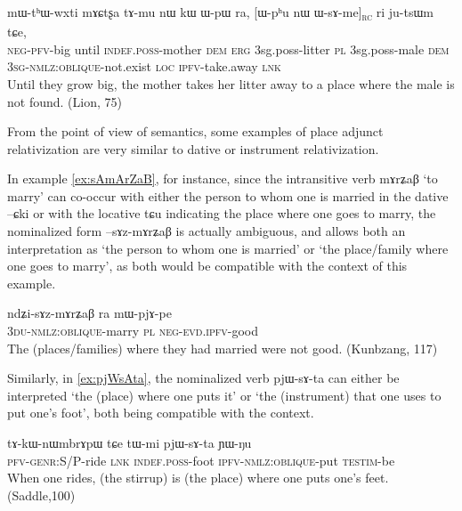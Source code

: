 \documentclass[oldfontcommands,oneside,a4paper,11pt]{article}
\newcommand{\ipa}[1]{{\phon #1}} %
\newcommand{\topic}{\textsc{dem}}
\newcommand{\rc}{\textsubscript{\textsc{rc}}}
\begin{document}
\begin{exe}
   \ex \label{ex:WsAme}
 \gll
\ipa{mɯ-tʰɯ-wxti}   	\ipa{mɤɕtʂa}   	\ipa{tɤ-mu}   	\ipa{nɯ}   	\ipa{kɯ}   	\ipa{ɯ-pɯ}   	\ipa{ra,}   	[\ipa{ɯ-pʰu}   	\ipa{nɯ}   	\ipa{ɯ-sɤ-me}]\rc{}   	\ipa{ri}   	\ipa{ju-tsɯm}   	\ipa{tɕe,}   \\
\textsc{neg-pfv}-big until \textsc{indef.poss}-mother \topic{} \textsc{erg}  {3sg.poss}-litter \textsc{pl}  {3sg.poss}-male \topic{} \textsc{3sg-nmlz:oblique}-not.exist  \textsc{loc} \textsc{ipfv}-take.away \textsc{lnk} \\
\glt  Until they grow big, the mother takes her litter away to a place where the male is not found. (Lion, 75)
  \end{exe}
From the point of view of semantics, some examples of place adjunct relativization are very similar to dative or instrument relativization. 

In example \ref{ex:sAmArZaB}, for instance, since the intransitive verb \ipa{mɤrʑaβ} `to marry' can co-occur with either the person to whom one is married in the dative \ipa{--ɕki} or with the locative \ipa{tɕu} indicating the place where one goes to marry, the nominalized form \ipa{--sɤz-mɤrʑaβ} is actually ambiguous, and allows both an interpretation as `the person to whom one is married' or `the place/family where one goes to marry', as both would be compatible with the context of this example.



\begin{exe}
   \ex \label{ex:sAmArZaB}
 \gll
	\ipa{ndʑi-sɤz-mɤrʑaβ}   	\ipa{ra}   	\ipa{mɯ-pjɤ-pe}   \\
\textsc{3du-nmlz:oblique}-marry \textsc{pl} \textsc{neg-evd.ipfv}-good \\
\glt The (places/families) where they had married were not good. (Kunbzang, 117)
\end{exe}


Similarly, in  \ref{ex:pjWsAta}, the nominalized verb 	\ipa{pjɯ-sɤ-ta}  can either be interpreted `the (place) where one puts it' or `the (instrument) that one uses to put one's foot', both being compatible with the context.

\begin{exe}
   \ex \label{ex:pjWsAta}
 \gll
\ipa{tɤ-kɯ-nɯmbrɤpɯ}   	\ipa{tɕe}   	\ipa{tɯ-mi}   	\ipa{pjɯ-sɤ-ta}   	\ipa{ɲɯ-ŋu}   \\
\textsc{pfv-genr:S/P}-ride \textsc{lnk}  \textsc{indef.poss}-foot \textsc{ipfv-nmlz:oblique}-put \textsc{testim}-be \\
\glt When one rides, (the stirrup) is (the place) where one puts one's feet. (Saddle,100)
\end{exe}
\end{document}
